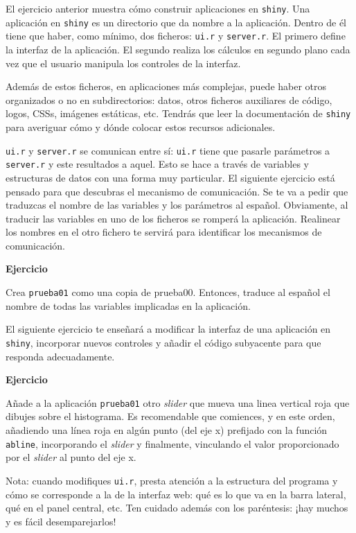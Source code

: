 \documentclass[]{article}
\newcounter{ejcnt}[section]
\numberwithin{ejcnt}{section}
\newenvironment{ej}[1][]{%
	\refstepcounter{ejcnt}%
	\par\medskip%
	\noindent%
	\textbf{Ejercicio \theejcnt \;\;}%
	\rmfamily%
}{\medskip}
\begin{document}
El ejercicio anterior muestra cómo construir aplicaciones en \texttt{shiny}. Una aplicación en \texttt{shiny} es un directorio que da nombre a la aplicación. Dentro de él tiene que haber, como mínimo, dos ficheros: \texttt{ui.r} y \texttt{server.r}. El primero define la interfaz de la aplicación. El segundo realiza los cálculos en segundo plano cada vez que el usuario manipula los controles de la interfaz.

Además de estos ficheros, en aplicaciones más complejas, puede haber otros organizados o no en subdirectorios: datos, otros ficheros auxiliares de código, logos, CSSs, imágenes estáticas, etc. Tendrás que leer la documentación de \texttt{shiny} para averiguar cómo y dónde colocar estos recursos adicionales.

\texttt{ui.r} y \texttt{server.r} se comunican entre sí: \texttt{ui.r} tiene que pasarle parámetros a \texttt{server.r} y este resultados a aquel. Esto se hace a través de variables y estructuras de datos con una forma muy particular. El siguiente ejercicio está pensado para que descubras el mecanismo de comunicación. Se te va a pedir que traduzcas el nombre de las variables y los parámetros al español. Obviamente, al traducir las variables en uno de los ficheros se romperá la aplicación. Realinear los nombres en el otro fichero te servirá para identificar los mecanismos de comunicación.

\begin{ej}
Crea \texttt{prueba01} como una copia de prueba00. Entonces, traduce al
español el nombre de todas las variables implicadas en la aplicación.
\end{ej}

El siguiente ejercicio te enseñará a modificar la interfaz de una aplicación en \texttt{shiny}, incorporar nuevos controles y añadir el código subyacente para que responda adecuadamente.

\begin{ej}
Añade a la aplicación \texttt{prueba01} otro \emph{slider} que mueva una
linea vertical roja que dibujes sobre el histograma. Es recomendable que
comiences, y en este orden, añadiendo una línea roja en algún punto (del
eje x) prefijado con la función \texttt{abline}, incorporando el
\emph{slider} y finalmente, vinculando el valor proporcionado por el
\emph{slider} al punto del eje x.

Nota: cuando modifiques \texttt{ui.r}, presta atención a la estructura
del programa y cómo se corresponde a la de la interfaz web: qué es lo
que va en la barra lateral, qué en el panel central, etc. Ten cuidado
además con los paréntesis: ¡hay muchos y es fácil desemparejarlos!
\end{ej}
\end{document}
